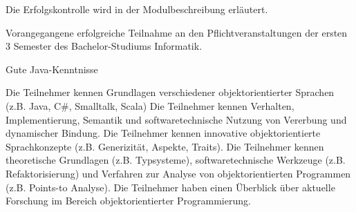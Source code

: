 \begin{course}

\setdoclanguagegerman
{}



\coursehead


\label{cour_6273.dp_997}


\begin{styleenv}
\begin{assessment}
Die Erfolgskontrolle wird in der Modulbeschreibung erläutert.


\end{assessment}

\begin{conditions}Vorangegangene erfolgreiche Teilnahme an den Pflichtveranstaltungen der ersten 3 Semester des Bachelor-Studiums Informatik.

\end{conditions}

\begin{recommendations}Gute Java-Kenntnisse

\end{recommendations}
\end{styleenv}

\begin{learningoutcomes}
Die Teilnehmer kennen Grundlagen verschiedener objektorientierter Sprachen (z.B. Java, C\#, Smalltalk, Scala) Die Teilnehmer kennen Verhalten, Implementierung, Semantik und softwaretechnische Nutzung von Vererbung und dynamischer Bindung. Die Teilnehmer kennen innovative objektorientierte Sprachkonzepte (z.B. Generizität, Aspekte, Traits). Die Teilnehmer kennen theoretische Grundlagen (z.B. Typsysteme), softwaretechnische Werkzeuge (z.B. Refaktorisierung) und Verfahren zur Analyse von objektorientierten Programmen (z.B. Points-to Analyse). Die Teilnehmer haben einen Überblick über aktuelle Forschung im Bereich objektorientierter Programmierung.



\end{learningoutcomes}
\end{course}
